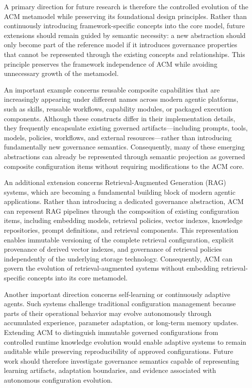 \documentclass[10pt]{article}
\begin{document}
A primary direction for future research is therefore the controlled evolution of the ACM metamodel while preserving its foundational design principles. Rather than continuously introducing framework-specific concepts into the core model, future extensions should remain guided by semantic necessity: a new abstraction should only become part of the reference model if it introduces governance properties that cannot be represented through the existing concepts and relationships. This principle preserves the framework independence of ACM while avoiding unnecessary growth of the metamodel.

An important example concerns reusable composite capabilities that are increasingly appearing under different names across modern agentic platforms, such as skills, reusable workflows, capability modules, or packaged execution components. Although these constructs differ in their implementation details, they frequently encapsulate existing governed artifacts—including prompts, tools, models, policies, workflows, and external resources—rather than introducing fundamentally new governance semantics. Consequently, many of these emerging abstractions can already be represented through semantic projection as governed composite configuration items without requiring modifications to the ACM core.

An additional extension concerns Retrieval-Augmented Generation (RAG) systems, which are becoming a fundamental building block of modern agentic applications. Rather than introducing a dedicated governance abstraction, ACM can represent RAG pipelines through the composition of existing configuration items, including embedding models, retrieval policies, vector indexes, knowledge repositories, prompt definitions, and retrieval components. This representation enables immutable versioning of the complete retrieval configuration, explicit provenance of derived vector indexes, and governance of retrieval policies independently of the underlying storage technology. Consequently, ACM can govern the evolution of retrieval-augmented systems without embedding retrieval-specific concepts into its core metamodel.

Another important direction concerns self-learning or continuously adaptive agents. Such systems challenge traditional configuration management because parts of their operational behavior may evolve autonomously through accumulated experience, parameter adaptation, or long-term memory updates. Extending ACM to distinguish immutable governed configurations from controlled runtime knowledge evolution would enable adaptive systems to remain auditable while preserving reproducibility of approved configurations. Future work should therefore investigate governance semantics capable of representing learning artifacts, adaptation boundaries, and evidence associated with autonomous configuration evolution.
\end{document}
